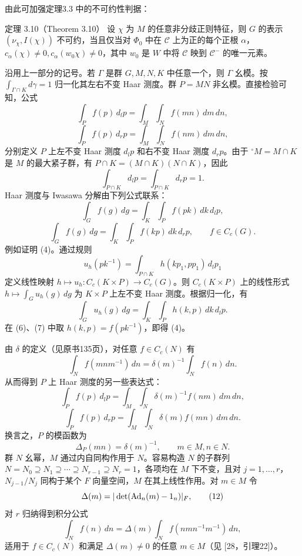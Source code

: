 由此可加强定理3.3 中的不可约性判据：
\begin{originaltheorem}{定理 3.10（Theorem 3.10）}
设 $\chi$ 为 $M$ 的任意非分歧正则特征，则 $G$ 的表示 $(\nu_\chi,I(\chi))$ 不可约，当且仅当对 $\Phi_0$ 中在 $\mathcal C$ 上为正的每个正根 $\alpha$，$c_\alpha(\chi)\ne0,c_\alpha(w_0\chi)\ne0$，其中 $w_0$ 是 $W$ 中将 $\mathcal C$ 映到 $\mathcal C^-$ 的唯一元素。
\end{originaltheorem}
沿用上一部分的记号。若 $\Gamma$ 是群 $G,M,N,K$ 中任意一个，则 $\Gamma$ 幺模。按 $\int_{\Gamma\cap K}d\gamma=1$ 归一化其左右不变 Haar 测度。群 $P=MN$ 非幺模。直接检验可知，公式
\[
\int_P f(p)\,d_lp=\int_M\int_N f(mn)\,dm\,dn,\tag{1}
\]
\[
\int_P f(p)\,d_rp=\int_M\int_N f(nm)\,dm\,dn,\tag{2}
\]
分别定义 $P$ 上左不变 Haar 测度 $d_lp$ 和右不变 Haar 测度 $d_rp$。由于 $^\circ M=M\cap K$ 是 $M$ 的最大紧子群，有 $P\cap K=(M\cap K)(N\cap K)$，因此
\[
\int_{P\cap K}d_lp=\int_{P\cap K}d_rp=1.\tag{3}
\]
Haar 测度与 Iwasawa 分解由下列公式联系：
\[
\int_G f(g)\,dg=\int_K\int_Pf(pk)\,dk\,d_lp,\tag{4}
\]
\[
\int_G f(g)\,dg=\int_K\int_Pf(kp)\,dk\,d_rp,\qquad f\in C_c(G).\tag{5}
\]
例如证明 (4)。通过规则
\[
u_h(pk^{-1})=\int_{P\cap K}h(kp_1,pp_1)\,d_lp_1\tag{6}
\]
定义线性映射 $h\mapsto u_h:C_c(K\times P)\to C_c(G)$。则 $C_c(K\times P)$ 上的线性形式 $h\mapsto\int_Gu_h(g)\,dg$ 为 $K\times P$ 上左不变 Haar 测度。根据归一化，有
\[
\int_Gu_h(g)\,dg=\int_K\int_Ph(k,p)\,dk\,d_lp.\tag{7}
\]
在 (6)、(7) 中取 $h(k,p)=f(pk^{-1})$，即得 (4)。

由 $\delta$ 的定义（见原书135页），对任意 $f\in C_c(N)$ 有
\[
\int_Nf(mnm^{-1})\,dn=\delta(m)^{-1}\int_Nf(n)\,dn.\tag{8}
\]
从而得到 $P$ 上 Haar 测度的另一些表达式：
\[
\int_Pf(p)\,d_lp=\int_M\int_N\delta(m)^{-1}f(nm)\,dm\,dn,\tag{9}
\]
\[
\int_Pf(p)\,d_rp=\int_M\int_N\delta(m)f(mn)\,dm\,dn.\tag{10}
\]
换言之，$P$ 的模函数为
\[
\Delta_P(mn)=\delta(m)^{-1},\qquad m\in M,n\in N.\tag{11}
\]
群 $N$ 幺幂，$M$ 通过内自同构作用于 $N$。容易构造 $N$ 的子群列 $N=N_0\supseteq N_1\supseteq\cdots\supseteq N_{r-1}\supseteq N_r=1$，各项均在 $M$ 下不变，且对 $j=1,\ldots,r$，$N_{j-1}/N_j$ 同构于某个 $F$ 向量空间，$M$ 在其上线性作用。对 $m\in M$ 令
\[
\Delta(m)=|\det(\operatorname{Ad}_{n}(m)-1_{n})|_F,\tag{12}
\]
对 $r$ 归纳得到积分公式
\[
\int_Nf(n)\,dn=\Delta(m)\int_Nf(nmn^{-1}m^{-1})\,dn,\tag{13}
\]
适用于 $f\in C_c(N)$ 和满足 $\Delta(m)\ne0$ 的任意 $m\in M$（见 [28，引理22]）。

